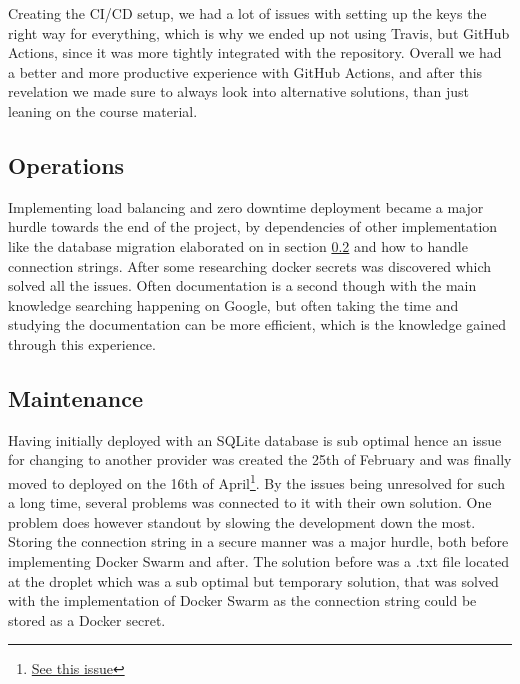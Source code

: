 \documentclass[report/main.tex]{subfiles}
\begin{document}
            Creating the CI/CD setup, we had a lot of issues with setting up the keys the right way for everything, which is why we ended up not using Travis, but GitHub Actions, since it was more tightly integrated with the repository. Overall we had a better and more productive experience with GitHub Actions, and after this revelation we made sure to always look into alternative solutions, than just leaning on the course material.  
    
            
        \subsection{Operations}
        \label{subsec:operations}
            
            Implementing load balancing and zero downtime deployment became a major hurdle towards the end of the project, by dependencies of other implementation like the database migration elaborated on in section \ref{subsec:maintenance} and how to handle connection strings. After some researching docker secrets was discovered which solved all the issues. Often documentation is a second though with the main knowledge searching happening on Google, but often taking the time and studying the documentation can be more efficient, which is the knowledge gained through this experience.
            
        \subsection{Maintenance}
        \label{subsec:maintenance}
            
            Having initially deployed with an SQLite database is sub optimal hence an issue for changing to another provider was created the 25th of February and was finally moved to deployed on the 16th of April\footnote{\href{https://github.com/gustavjohansen98/E-vil-Corp/issues/62}{See this issue}}. By the issues being unresolved for such a long time, several problems was connected to it with their own solution. One problem does however standout by slowing the development down the most. Storing the connection string in a secure manner was a major hurdle, both before implementing Docker Swarm and after. The solution before was a .txt file located at the droplet which was a sub optimal but temporary solution, that was solved with the implementation of Docker Swarm as the connection string could be stored as a Docker secret.
            
\end{document}
